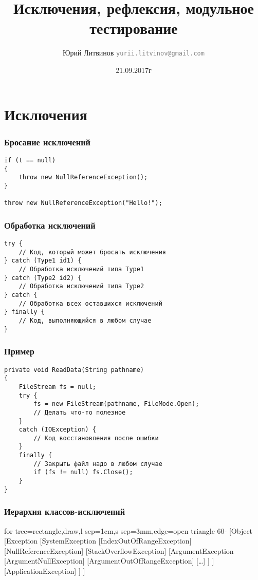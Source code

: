 \documentclass[xetex,mathserif,serif]{beamer}
\title{Исключения, рефлексия, модульное тестирование}
\author[Юрий Литвинов]{Юрий Литвинов \newline \textcolor{gray}{\small\texttt{yurii.litvinov@gmail.com}}}
\date{21.09.2017г}
\begin{document}
	\frame{\titlepage}

	\section{Исключения}

	\begin{frame}[fragile]
		\frametitle{Бросание исключений}
		\begin{verbatim}
if (t == null)
{
    throw new NullReferenceException();
}

throw new NullReferenceException("Hello!");
		\end{verbatim}
	\end{frame}

	\begin{frame}[fragile]
		\frametitle{Обработка исключений}
		\begin{verbatim}
try {
    // Код, который может бросать исключения
} catch (Type1 id1) {
    // Обработка исключений типа Type1
} catch (Type2 id2) {
    // Обработка исключений типа Type2
} catch {
    // Обработка всех оставшихся исключений
} finally {
    // Код, выполняющийся в любом случае
}
		\end{verbatim}
	\end{frame}

	\begin{frame}[fragile]
		\frametitle{Пример}
		\begin{verbatim}
private void ReadData(String pathname) 
{
    FileStream fs = null;
    try {
        fs = new FileStream(pathname, FileMode.Open);
        // Делать что-то полезное
    }
    catch (IOException) {
        // Код восстановления после ошибки
    }
    finally {
        // Закрыть файл надо в любом случае
        if (fs != null) fs.Close();
    }
}
		\end{verbatim}
	\end{frame}

	\begin{frame}
		\frametitle{Иерархия классов-исключений}
		\begin{tiny}
			\begin{forest}
				for tree={rectangle,draw,l sep=1cm,s sep=3mm,edge=open triangle 60-}
				[Object
					[Exception
						[SystemException
							[IndexOutOfRangeException]
							[NullReferenceException]
							[StackOverflowException]
							[ArgumentException
								[ArgumentNullException]
								[ArgumentOutOfRangeException]
								[\dots]
							]
						]
						[ApplicationException]
					]
				]
			\end{forest}
		\end{tiny}
	\end{frame}
\end{document}
